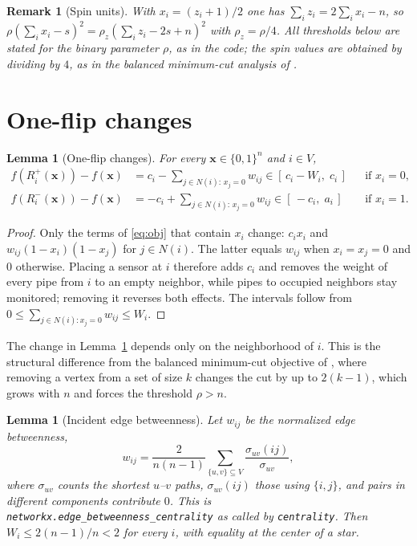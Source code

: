 \documentclass[11pt]{article}
\newtheorem{lemma}[theorem]{Lemma}
\newtheorem{remark}[theorem]{Remark}
\newcommand{\x}{\mathbf{x}}
\begin{document}
\begin{remark}[Spin units]
\label{rem:spin}
With $x_i=(z_i+1)/2$ one has $\sum_iz_i=2\sum_ix_i-n$, so
$\rho(\sum_ix_i-s)^2=\rho_z(\sum_iz_i-2s+n)^2$ with $\rho_z=\rho/4$. All
thresholds below are stated for the binary parameter $\rho$, as in the code; the
spin values are obtained by dividing by $4$, as in the balanced minimum-cut
analysis of \cite{RSDB2026}.
\end{remark}

\section{One-flip changes}
\label{sec:flips}

\begin{lemma}[One-flip changes]
\label{lem:flip}
For every $\x\in\{0,1\}^n$ and $i\in V$,
\begin{align}
f(R_i^+(\x))-f(\x)&=c_i-\sum_{j\in N(i):\,x_j=0}w_{ij}\in[\,c_i-W_i,\;c_i\,]
&&\text{if }x_i=0,
\label{eq:flip-add}\\
f(R_i^-(\x))-f(\x)&=-c_i+\sum_{j\in N(i):\,x_j=0}w_{ij}\in[\,-c_i,\;a_i\,]
&&\text{if }x_i=1.
\label{eq:flip-remove}
\end{align}
\end{lemma}

\begin{proof}
Only the terms of \eqref{eq:obj} that contain $x_i$ change: $c_ix_i$ and
$w_{ij}(1-x_i)(1-x_j)$ for $j\in N(i)$. The latter equals $w_{ij}$ when $x_i=x_j=0$
and $0$ otherwise. Placing a sensor at $i$ therefore adds $c_i$ and removes the
weight of every pipe from $i$ to an empty neighbor, while pipes to occupied
neighbors stay monitored; removing it reverses both effects. The intervals follow
from $0\le\sum_{j\in N(i):x_j=0}w_{ij}\le W_i$.
\end{proof}

The change in Lemma~\ref{lem:flip} depends only on the neighborhood of $i$. This is
the structural difference from the balanced minimum-cut objective of
\cite{RSDB2026}, where removing a vertex from a set of size $k$ changes the cut by
up to $2(k-1)$, which grows with $n$ and forces the threshold $\rho>n$.

\begin{lemma}[Incident edge betweenness]
\label{lem:betweenness}
Let $w_{ij}$ be the normalized edge betweenness,
\[
w_{ij}=\frac{2}{n(n-1)}\sum_{\{u,v\}\subseteq V}\frac{\sigma_{uv}(ij)}{\sigma_{uv}},
\]
where $\sigma_{uv}$ counts the shortest $u$--$v$ paths, $\sigma_{uv}(ij)$ those
using $\{i,j\}$, and pairs in different components contribute $0$. This is
\texttt{networkx.edge\_betweenness\_centrality} as called by \texttt{centrality}.
Then $W_i\le 2(n-1)/n<2$ for every $i$, with equality at the center of a star.
\end{lemma}
\end{document}
